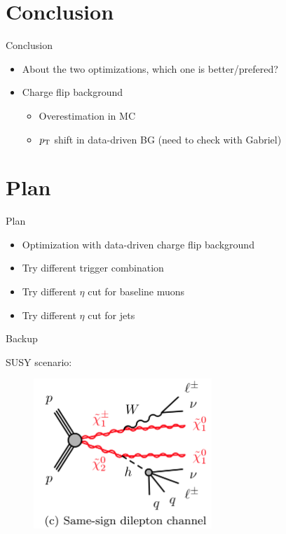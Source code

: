 \documentclass[mathserif,serif]{beamer}
\begin{document}
%
%

\section{Conclusion}
\begin{frame}{Conclusion}
\begin{itemize}
\item About the two optimizations, which one is better/prefered?
\item Charge flip background
\begin{itemize}
\item Overestimation in MC
\item $p_{\text{T}}$ shift in data-driven BG (need to check with Gabriel)
\end{itemize}
\end{itemize}
\end{frame}

\section{Plan}
\begin{frame}{Plan}
\begin{itemize}
\item Optimization with data-driven charge flip background
\item Try different trigger combination
\item Try different $\eta$ cut for baseline muons
\item Try different $\eta$ cut for jets
\end{itemize}
\end{frame}

\begin{frame}
\begin{center}
\huge
Backup
\end{center}
\end{frame}

\begin{frame}
\small
SUSY scenario:\\
\begin{figure}
\includegraphics[width=0.6\textwidth]{data/photo/Wh.png}
\end{figure}
\end{frame}
\end{document}
